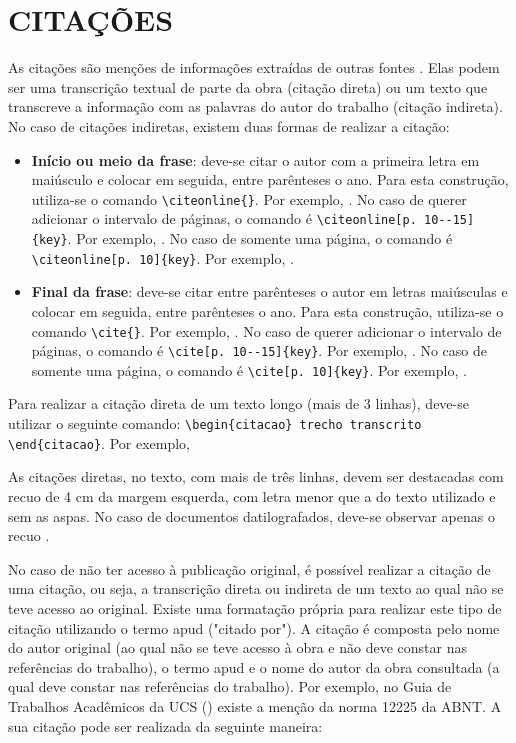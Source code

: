 \section{CITAÇÕES} 

As citações são menções de informações extraídas de outras fontes \cite{NBR10520:2002}. Elas podem ser uma transcrição textual de parte da obra (citação direta) ou um texto que transcreve a informação com as palavras do autor do trabalho (citação indireta). 
No caso de citações indiretas, existem duas formas de realizar a citação:

\begin{itemize}
	\item \textbf{Início ou meio da frase}: deve-se citar o autor com a primeira letra em maiúsculo e colocar em seguida, entre parênteses o ano. Para esta construção, utiliza-se o comando \verb=\citeonline{}=. Por exemplo,  . No caso de querer adicionar o intervalo de páginas, o comando é  \verb=\citeonline[p. 10--15]{key}=. Por exemplo, . No caso de somente uma página, o comando é  \verb=\citeonline[p. 10]{key}=. Por exemplo, .
	          
	\item \textbf{Final da frase}: deve-se citar entre parênteses o autor em letras maiúsculas e colocar em seguida, entre parênteses o ano. Para esta construção, utiliza-se o comando \verb=\cite{}=. Por exemplo, \cite{Acevedo2013}. No caso de querer adicionar o intervalo de páginas, o comando é \verb=\cite[p. 10--15]{key}=. Por exemplo, \cite[pp. 21--30]{Acevedo2013}. No caso de somente uma página, o comando é  \verb=\cite[p. 10]{key}=. Por exemplo, \cite[p. 21]{Acevedo2013}.
\end{itemize}

Para realizar a citação direta de um texto longo (mais de 3 linhas), deve-se utilizar o seguinte comando: \verb=\begin{citacao} trecho transcrito \end{citacao}=. Por exemplo, 
\begin{citacao}
	As citações diretas, no texto, com mais de três linhas, devem ser destacadas com recuo de 4 cm da margem esquerda, com letra menor que a do texto utilizado e sem as aspas. No caso de documentos datilografados, deve-se observar apenas
	o recuo \cite[p. 2]{NBR10520:2002}.
\end{citacao}

No caso de não ter acesso à publicação original, é possível realizar a citação de uma citação, ou seja, a transcrição direta ou indireta de um texto ao qual não se teve acesso ao original. Existe uma formatação própria para realizar este tipo de citação utilizando o termo apud ("citado por"). A citação é composta pelo nome do autor original (ao qual não se teve acesso à obra e não deve constar nas referências do trabalho), o termo apud e o nome do autor da obra consultada (a qual deve constar nas referências do trabalho). Por exemplo, no Guia de Trabalhos Acadêmicos da UCS (\cite{guiaUCS}) existe a menção da norma 12225 da ABNT. A sua citação pode ser realizada da seguinte maneira:

